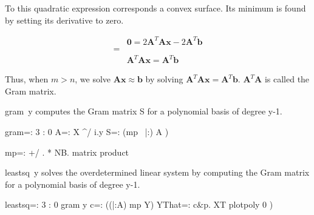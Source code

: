 \documentclass[10pt]{article}%
\renewcommand{\vec}[1]{\boldsymbol{#1}}
\begin{document}
To this quadratic expression corresponds a convex surface.
Its minimum is found by setting its derivative to zero.

\begin{align*}
 & \vec{0} = 2\vec{A}^T\vec{A}\vec{x} - 2\vec{A}^T\vec{b} \\
=& \\
 & \vec{A}^T\vec{A}\vec{x} = \vec{A}^T\vec{b}
\end{align*}

Thus, when $m>n$, we solve $\vec{A}\vec{x}\approx\vec{b}$ by solving
$\vec{A}^T\vec{A}\vec{x} = \vec{A}^T\vec{b}$.
$\vec{A}^T\vec{A}$ is called the Gram matrix.

{\Tt{}gram\ y\nwendquote} computes the Gram matrix {\Tt{}S\nwendquote} for a polynomial basis of degree {\Tt{}y-1\nwendquote}.

\nwenddocs{}\endmoddef\nwstartdeflinemarkup{}\nwenddeflinemarkup
gram=: 3 : 0
  A=: X ^/ i.y
  S=: (mp~ |:) A
) 

\nwendcode{}\plusendmoddef\nwstartdeflinemarkup{}\nwenddeflinemarkup
mp=: +/ . * NB. matrix product

\nwendcode{}\nwdocspar

{\Tt{}leastsq\ y\nwendquote} solves the overdetermined linear system by computing the Gram
matrix for a polynomial basis of degree {\Tt{}y-1\nwendquote}.

\nwenddocs{}\plusendmoddef\nwstartdeflinemarkup{}\nwenddeflinemarkup
leastsq=: 3 : 0
  gram y
  c=: ((|:A) mp Y) %
  YThat=: c&p. XT
  plotpoly 0
)
\end{document}
